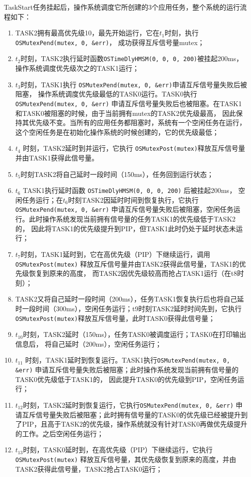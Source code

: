\documentclass{ctexart}
\begin{document}
    TaskStart任务挂起后，操作系统调度它所创建的3个应用任务，整个系统的运行流程如下：
    \begin{enumerate}
        \item TASK2拥有最高优先级10，最先开始运行，它在$t_1$时刻，执行\lstinline|OSMutexPend(mutex, 0, &err)|，
            成功获得互斥信号量mutex；
        \item $t_2$时刻，TASK2执行延时函数\lstinline|OSTimeDlyHMSM(0, 0, 0, 200)|被挂起200ms，
            操作系统调度优先级次之的TASK1运行；
        \item $t_3$时刻，TASK1执行 \lstinline|OSMutexPend(mutex, 0, &err)|申请互斥信号量失败后被阻塞，
            操作系统调度优先级最低的TASK0运行。TASK0执行\lstinline|OSMutexPend(mutex, 0, &err)|
            申请互斥信号量失败后也被阻塞。在TASK1和TASK0被阻塞的时候，由于当前拥有mutex的TASK2优先级最高，
            因此保持其优先级不变。当所有的应用任务都阻塞时，系统有一个空闲任务在运行，
            这个空闲任务是在初始化操作系统的时候创建的，它的优先级最低；
        \item $t_4$ 时刻，TASK2延时到并运行，它执行 \lstinline|OSMutexPost(mutex)|释放互斥信号量并由TASK1获得此信号量。
        \item $t_5$时刻TASK2将自己延时一段时间（150ms），任务回到运行状态；
        \item $t_6$ TASK1执行延时函数 \lstinline|OSTimeDlyHMSM(0, 0, 0, 200)| 后被挂起200ms，
        空闲任务运行；在$t_6$时刻TASK2因延时时间到恢复执行，它执行\lstinline|OSMutexPend(mutex, 0, &err)|
        申请互斥信号量失败后被阻塞，空闲任务运行。此时操作系统发现当前拥有信号量的任务TASK1的优先级低于TASK2的，
        因此将TASK1的优先级提升到PIP，但TASK1此时仍处于延时状态未运行；
        \item $t_7$时刻，TASK1延时到，它在高优先级（PIP）下继续运行，调用\lstinline|OSMutexPost(mutex)|
        释放互斥信号量并由TASK2获得此信号量，TASK1的优先级恢复到原来的高度，
        而TASK2因优先级较高而抢占TASK1运行（在t8时刻）；
        \item TASK2又将自己延时一段时间（200ms），任务TASK1恢复执行后也将自己延时一段时间（300ms），空闲任务运行；t9时刻TASK2延时时间先到，它执行\lstinline|OSMutexPost(mutex)|释放互斥信号量，此时TASK0获得此信号量；
        \item $t_{10}$时刻，TASK2延时（150ms），任务TASK0被调度运行；TASK0在打印输出信息后，
        将自己延时（200ms），空闲任务运行；
        \item $t_{11}$ 时刻，TASK1延时到恢复运行。TASK1执行\lstinline|OSMutexPend(mutex, 0, &err)|
        申请互斥信号量失败后被阻塞；此时操作系统发现当前拥有信号量的TASK0优先级低于TASK1的，
        因此提升TASK0的优先级到PIP，空闲任务运行；
        \item $t_{12}$时刻，TASK2延时到恢复运行，它执行\lstinline|OSMutexPend(mutex, 0, &err)|
        申请互斥信号量失败后被阻塞；此时拥有信号量的TASK0的优先级已经被提升到了PIP，且高于TASK2的优先级，操作系统就没有针对TASK0再做优先级提升的工作。之后空闲任务运行；
        \item $t_{13}$时刻，TASK0延时到，在高优先级（PIP）下继续运行，它执行\lstinline|OSMutexPost(mutex)|
        释放互斥信号量，其优先级恢复到原来的高度，并由TASK2获得此信号量，TASK2抢占TASK0运行；
    \end{enumerate}
    
\end{document}

